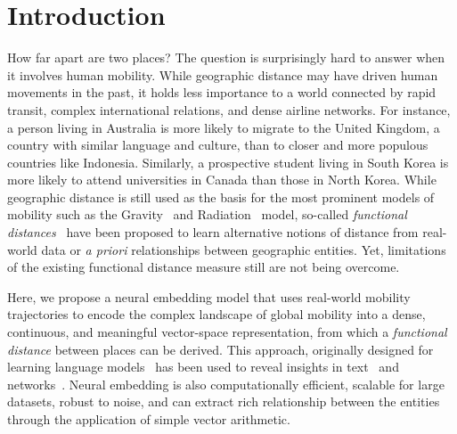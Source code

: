 \documentclass[12pt]{article} %
\begin{document}
%
%
\section{Introduction}\label{sec:introduction} %


How far apart are two places?
The question is surprisingly hard to answer when it involves human mobility.
While geographic distance may have driven human movements in the past, it holds less importance to a world connected by rapid transit, complex international relations, and dense airline networks.
For instance, a person living in Australia is more likely to migrate to the United Kingdom, a country with similar language and culture, than to closer and more populous countries like Indonesia. 
Similarly, a prospective student living in South Korea is more likely to attend universities in Canada than those in North Korea. 
While geographic distance is still used as the basis for the most prominent models of mobility such as the Gravity~\autocite{zipf1946gravity} and Radiation~\autocite{simini2012universal} model, so-called \textit{functional distances}~\autocite{boschma2005proximity, brown1970functional, brown1970migration, kim2018functional} have been proposed to learn alternative notions of distance from real-world data or \textit{a priori} relationships between geographic entities.  Yet, limitations of the existing functional distance measure still are not being overcome.

Here, we propose a neural embedding model that uses real-world mobility trajectories to encode the complex landscape of global mobility into a dense, continuous, and meaningful vector-space representation, from which a \textit{functional distance} between places can be derived.
This approach, originally designed for learning language models~\autocite{mikolov2013word2vec} has been used to reveal insights in text~\autocite{linzhuo2020hyperbolic, tshitoyan2019mat2vec, garg2018gender, kozlowski2018geometry, hamilton2016diachronic, le2014doc2vec, nakandala2016twitch} and networks~\autocite{perozzi2014deepwalk, grover2016node2vec}.
Neural embedding is also computationally efficient, scalable for large datasets, robust to noise, and can extract rich relationship between the entities through the application of simple vector arithmetic. 
\end{document}

